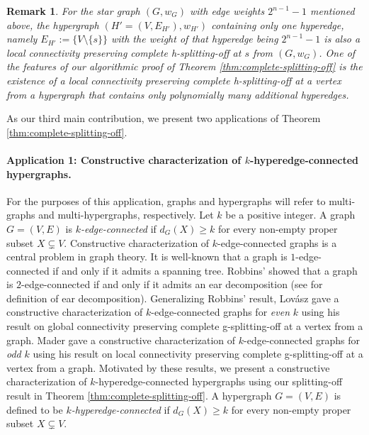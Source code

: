 \documentclass{article}
\newtheorem{remark}{Remark}[section]
\newcommand{\knote}[1]{{\color{red}[{\tiny Karthik: \bf #1}]\marginpar{\color{red}*}}}
\begin{document}
\begin{remark}
For the star graph $(G,w_G)$ with edge weights $2^{n-1}-1$ mentioned above, the hypergraph $(H'=(V, E_{H'}), w_{H'})$ containing only one hyperedge, namely $E_{H'}:=\{V\setminus \{s\}\}$ with the weight of that hyperedge being $2^{n-1}-1$ is also a local connectivity preserving complete h-splitting-off at $s$ from $(G,w_G)$. 
One of the features of our algorithmic proof of Theorem \ref{thm:complete-splitting-off} is the existence of a local connectivity preserving complete h-splitting-off at a vertex from a hypergraph that contains only polynomially many additional hyperedges. 
\end{remark}

As our third main contribution, 
we present two applications of Theorem \ref{thm:complete-splitting-off}. 

\paragraph{Application 1: Constructive characterization of $k$-hyperedge-connected hypergraphs.}
For the purposes of this application, 
graphs and hypergraphs will refer to multi-graphs and multi-hypergraphs, respectively.
Let $k$ be a positive integer. A graph $G=(V, E)$ is \emph{$k$-edge-connected} if $d_{G}(X)\ge k$ for every non-empty proper subset $X\subsetneq V$. 
Constructive characterization of $k$-edge-connected graphs is a central problem in graph theory. 
It is well-known that a graph is $1$-edge-connected if and only if it admits a spanning tree. 
Robbins' \cite{Rob39} showed that a graph is $2$-edge-connected if and only if it admits an ear decomposition (see \cite{Frank-book} for definition of ear decomposition). 
Generalizing Robbins' result, 
Lov\'{a}sz \cite{Lov74, Lovasz-problems-book} gave a constructive characterization of $k$-edge-connected graphs for \emph{even} $k$ using his result on global connectivity preserving complete g-splitting-off at a vertex from a graph. 
Mader \cite{Mad78} gave a constructive characterization of $k$-edge-connected graphs for \emph{odd} $k$ using his result on local connectivity preserving complete g-splitting-off at a vertex from a graph. 
Motivated by these results, we present a constructive characterization of $k$-hyperedge-connected hypergraphs using our splitting-off result in Theorem \ref{thm:complete-splitting-off}.
A hypergraph $G=(V, E)$ is defined to be \emph{$k$-hyperedge-connected} if $d_{G}(X)\ge k$ for every non-empty proper subset $X\subsetneq V$. 
\end{document}
